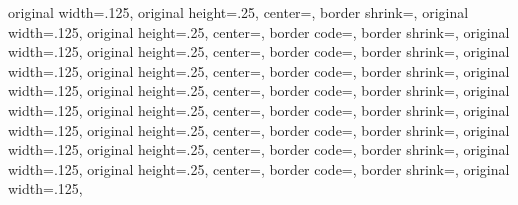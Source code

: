 {{	original width=.125\pgfpageoptionheight,%
	original height=.25\pgfpageoptionwidth,%
	center=\pgfpoint{.75\pgfphysicalwidth}{.125\pgfphysicalheight},%
}%
%
%
  {%
	border shrink=\pgfpageoptionborder,%
	original width=.125\pgfpageoptionheight,%
	original height=.25\pgfpageoptionwidth,%
	center=\pgfpoint{.75\pgfphysicalwidth}{\pgfphysicalheight},%
	border code=\pgfsetlinewidth{.5pt}\pgfstroke,%
  }%
  {%
	border shrink=\pgfpageoptionborder,%
	original width=.125\pgfpageoptionheight,%
	original height=.25\pgfpageoptionwidth,%
	center=\pgfpoint{.5\pgfphysicalwidth}{\pgfphysicalheight},%
	border code=\pgfsetlinewidth{.5pt}\pgfstroke,%
	}%
  {%
	border shrink=\pgfpageoptionborder,%
	original width=.125\pgfpageoptionheight,%
	original height=.25\pgfpageoptionwidth,%
	center=\pgfpoint{.25\pgfphysicalwidth}{\pgfphysicalheight},%
	border code=\pgfsetlinewidth{.5pt}\pgfstroke,%
  }%
  {%
	border shrink=\pgfpageoptionborder,%
	original width=.125\pgfpageoptionheight,%
	original height=.25\pgfpageoptionwidth,%
	center=\pgfpoint{0pt}{\pgfphysicalheight},%
	border code=\pgfsetlinewidth{.5pt}\pgfstroke,%
  }%
  {%
	border shrink=\pgfpageoptionborder,%
	original width=.125\pgfpageoptionheight,%
	original height=.25\pgfpageoptionwidth,%
	center=\pgfpoint{.75\pgfphysicalwidth}{.875\pgfphysicalheight},%
	border code=\pgfsetlinewidth{.5pt}\pgfstroke,%
  }%
  {%
	border shrink=\pgfpageoptionborder,%
	original width=.125\pgfpageoptionheight,%
	original height=.25\pgfpageoptionwidth,%
	center=\pgfpoint{.5\pgfphysicalwidth}{.875\pgfphysicalheight},%
	border code=\pgfsetlinewidth{.5pt}\pgfstroke,%
	}%
  {%
	border shrink=\pgfpageoptionborder,%
	original width=.125\pgfpageoptionheight,%
	original height=.25\pgfpageoptionwidth,%
	center=\pgfpoint{.25\pgfphysicalwidth}{.875\pgfphysicalheight},%
	border code=\pgfsetlinewidth{.5pt}\pgfstroke,%
  }%
  {%
	border shrink=\pgfpageoptionborder,%
	original width=.125\pgfpageoptionheight,%
	original height=.25\pgfpageoptionwidth,%
	center=\pgfpoint{0pt}{.875\pgfphysicalheight},%
	border code=\pgfsetlinewidth{.5pt}\pgfstroke,%
  }%
  {%
	border shrink=\pgfpageoptionborder,%
	original width=.125\pgfpageoptionheight,%
}}
